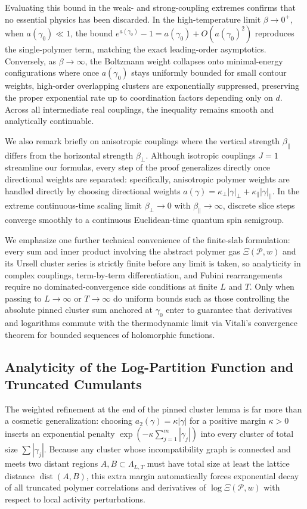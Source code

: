 \documentclass[11pt]{article}
\theoremstyle{definition}
\begin{document}
Evaluating this bound in the weak- and strong-coupling extremes confirms that no
essential physics has been discarded. In the high-temperature limit $\beta \to 0^+$,
when $a(\gamma_0) \ll 1$, the bound $e^{a(\gamma_0)} - 1 = a(\gamma_0) +
O(a(\gamma_0)^2)$ reproduces the single-polymer term, matching the exact
leading-order asymptotics. Conversely, as $\beta \to \infty$, the Boltzmann weight
collapses onto minimal-energy configurations where once $a(\gamma_0)$ stays
uniformly bounded for small contour weights, high-order overlapping clusters are
exponentially suppressed, preserving the proper exponential rate up to coordination
factors depending only on $d$. Across all intermediate real couplings, the
inequality remains smooth and analytically continuable.

We also remark briefly on anisotropic couplings where the vertical strength
$\beta_\parallel$ differs from the horizontal strength $\beta_\perp$. Although
isotropic couplings $J = 1$ streamline our formulas, every step of the proof
generalizes directly once directional weights are separated: specifically,
anisotropic polymer weights are handled directly by choosing directional weights
$a(\gamma) = \kappa_\perp |\gamma|_\perp + \kappa_\parallel |\gamma|_\parallel$. In
the extreme continuous-time scaling limit $\beta_\perp \to 0$ with $\beta_\parallel
\to \infty$, discrete slice steps converge smoothly to a continuous Euclidean-time
quantum spin semigroup.

We emphasize one further technical convenience of the finite-slab formulation: every
sum and inner product involving the abstract polymer gas $\Xi(\mathcal{P}, w)$ and
its Ursell cluster series is strictly finite before any limit is taken, so
analyticity in complex couplings, term-by-term differentiation, and Fubini
rearrangements require no dominated-convergence side conditions at finite $L$ and
$T$. Only when passing to $L \to \infty$ or $T \to \infty$ do uniform bounds such as
those controlling the absolute pinned cluster sum anchored at $\gamma_0$ enter to
guarantee that derivatives and logarithms commute with the thermodynamic limit via
Vitali's convergence theorem for bounded sequences of holomorphic functions.

\subsection{Analyticity of the Log-Partition Function and Truncated Cumulants}
\label{subsec:s03b}

The weighted refinement at the end of the pinned cluster lemma is far more than a
cosmetic generalization: choosing $a_2(\gamma) = \kappa |\gamma|$ for a positive
margin $\kappa > 0$ inserts an exponential penalty $\exp(-\kappa \sum_{j=1}^m
|\gamma_j|)$ into every cluster of total size $\sum |\gamma_j|$. Because any cluster
whose incompatibility graph is connected and meets two distant regions $A, B \subset
\Lambda_{L,T}$ must have total size at least the lattice distance
$\operatorname{dist}(A, B)$, this extra margin automatically forces exponential
decay of all truncated polymer correlations and derivatives of $\log
\Xi(\mathcal{P}, w)$ with respect to local activity perturbations.
\end{document}
